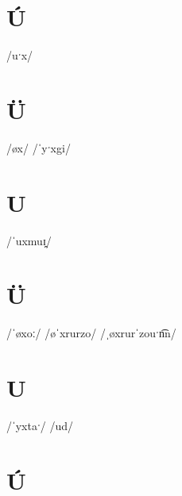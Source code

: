 \documentclass[10pt,a4paper,twoside]{book}
\begin{document}
\section*{Ú}

\begin{multicols}{3}
 {/uˑx/} {}
\end{multicols}

\section*{Ü}

\begin{multicols}{3}
 {/øx/} {}
 {/ˈyˑxgi/} {}
\end{multicols}

\section*{U}

\begin{multicols}{3}
 {/ˈuxmuɪ̯/} {}
\end{multicols}

\section*{Ü}

\begin{multicols}{3}
 {/ˈøxoː/} {}
 {/øˈxrurzo/} {}
 {/ˌøxrurˈzouˑn͡n/} {}
\end{multicols}

\section*{U}

\begin{multicols}{3}
 {/ˈyxtaˑ/} {}
 {/ud/} {}
\end{multicols}

\section*{Ú}
\end{document}
